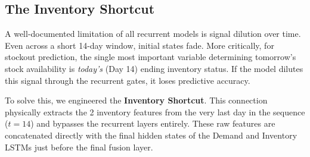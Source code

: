 \subsection{The Inventory Shortcut}
A well-documented limitation of all recurrent models is signal dilution over time. Even across a short 14-day window, initial states fade. More critically, for stockout prediction, the single most important variable determining tomorrow's stock availability is \textit{today's} (Day 14) ending inventory status. If the model dilutes this signal through the recurrent gates, it loses predictive accuracy.

To solve this, we engineered the \textbf{Inventory Shortcut}. This connection physically extracts the 2 inventory features from the very last day in the sequence ($t=14$) and bypasses the recurrent layers entirely. These raw features are concatenated directly with the final hidden states of the Demand and Inventory LSTMs just before the final fusion layer.

